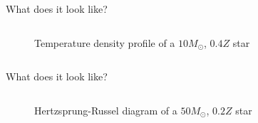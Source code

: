 \documentclass{beamer}
\begin{document}
\begin{frame}{What does it look like?}
\begin{columns}
\begin{column}{0.5\textwidth}
\begin{center}
\begin{figure}
                    \caption{Temperature density profile of a $10M_\odot$, $0.4Z$ star}
                \end{figure}
            \end{center}
        \end{column}
    \end{columns}      
\end{frame}

\begin{frame}{What does it look like?}
    \begin{columns}
        \begin{column}{0.5\textwidth}
            \begin{center}
                \begin{figure}
                    \caption{Hertzsprung-Russel diagram of a $50M_\odot$, $0.2Z$ star}
                \end{figure}
            \end{center}
        \end{column}
        \begin{column}{0.5\textwidth}
            \begin{center}
                \begin{figure}

\end{figure}
\end{center}
\end{column}
\end{columns}
\end{frame}
\end{document}
